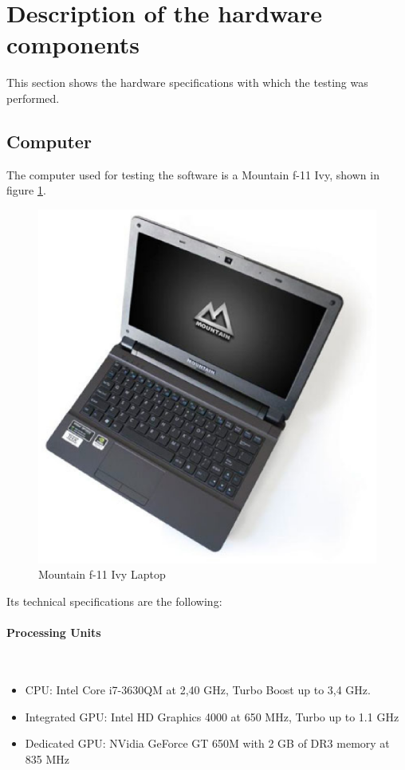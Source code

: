 \section{Description of the hardware components}
This section shows the hardware specifications with which the testing was performed. 

\subsection{Computer}
	The computer used for testing the software is a Mountain f-11 Ivy, shown in figure \ref{laptop}.

	\begin{figure}[H]
		\begin{center}
	\includegraphics[scale=0.3]{img/mountain.eps}
		\caption[Mountain laptop]{Mountain f-11 Ivy Laptop}
				\label{laptop}

		\end{center}
	\end{figure}

	Its technical specifications are the following: 

	\paragraph{Processing Units} \mbox{}\\
		\begin{itemize}
			\item{CPU: Intel Core i7-3630QM at 2,40 GHz, Turbo Boost up to 3,4 GHz.}
			\item{Integrated GPU:  Intel HD Graphics 4000 at 650 MHz,  Turbo up to 1.1 GHz }
			\item{Dedicated GPU: NVidia GeForce GT 650M with 2 GB of DR3 memory at 835 MHz }
		\end{itemize}


